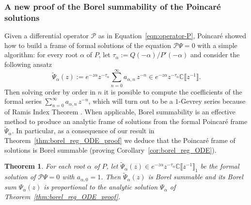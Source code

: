 \documentclass{article}
\newcommand{\C}{\mathbb{C}}
\newcommand{\series}[1]{\tilde{#1}}
\theoremstyle{definition}
\theoremstyle{plain}
\newtheorem{theorem}{Theorem}[section]
\begin{document}
\subsubsection{A new proof of the Borel summability of the Poincar\'{e} solutions}\label{sec:new-summability-proof}
Given a differential operator $\mathcal{P}$ as in Equation~\eqref{eqn:operator-P}, Poincar\'e showed how to build a frame of formal solutions of the equation $\mathcal{P}\Psi=0$ with a simple algorithm: for every root $\alpha$ of $P$, let $\tau_\alpha:=Q(-\alpha)/P'(-\alpha)$ and consider the following ansatz
\begin{equation}
    \tilde{\Psi}_\alpha(z):=e^{-z\alpha}z^{-\tau_\alpha}\sum_{n=0}^\infty a_{\alpha,n}\, z^{-n}\in e^{-z\alpha} z^{-\tau_\alpha}\C\llbracket z^{-1}\rrbracket.
\end{equation}
Then solving order by order in $n$ it is possible to compute the coefficients of the formal series $\sum_{n=0}^\infty a_{\alpha,n}\, z^{-n}$, which will turn out to be a $1$-Gevrey series because of Ramis
Index Theorem \cite{ramis_index}. When applicable, Borel summability is an effective method to produce an analytic frame of solutions from the formal Poincar\'e frame $\tilde{\Psi}_\alpha$. In particular, as a consequence of our result in Theorem~\ref{thm:borel_reg_ODE_proof} we deduce that the Poincar\'e frame of solutions is Borel summable (proving Corollary~\ref{cor:borel_reg_ODE}).
\begin{theorem}\label{thm2-dim}
For each root $\alpha$ of $P$, let $\tilde{\Psi}_\alpha(z)\in e^{-z\alpha} z^{-\tau_\alpha}\C\llbracket z^{-1}\rrbracket_1$ be the formal solution of $\mathcal{P}\Psi=0$ with $a_{\alpha,0}=1$. Then $\series{\Psi}_\alpha(z)$ is Borel summable and its Borel sum $\hat{\Psi}_\alpha(z)$ is proportional to the analytic solution $\Psi_\alpha$ of Theorem~\ref{thm:borel_reg_ODE_proof}. 
\end{theorem}
\end{document}
